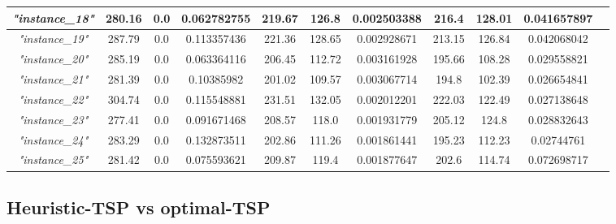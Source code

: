 \documentclass{article}
\begin{document}
\begin{table}[H]
\begin{center}
\begin{tabular}{|c||c|c|c|c|c|c|c|c|c|c|}
\hline
\textit{"instance\_18"} & 280.16 & 0.0 & 0.062782755 & 219.67 & 126.8 & 0.002503388 & 216.4 & 128.01 & 0.041657897 \\
\hline
\textit{"instance\_19"} & 287.79 & 0.0 & 0.113357436 & 221.36 & 128.65 & 0.002928671 & 213.15 & 126.84 & 0.042068042 \\
\hline
\textit{"instance\_20"} & 285.19 & 0.0 & 0.063364116 & 206.45 & 112.72 & 0.003161928 & 195.66 & 108.28 & 0.029558821 \\
\hline
\textit{"instance\_21"} & 281.39 & 0.0 & 0.10385982 & 201.02 & 109.57 & 0.003067714 & 194.8 & 102.39 & 0.026654841 \\
\hline
\textit{"instance\_22"} & 304.74 & 0.0 & 0.115548881 & 231.51 & 132.05 & 0.002012201 & 222.03 & 122.49 & 0.027138648 \\
\hline
\textit{"instance\_23"} & 277.41 & 0.0 & 0.091671468 & 208.57 & 118.0 & 0.001931779 & 205.12 & 124.8 & 0.028832643 \\
\hline
\textit{"instance\_24"} & 283.29 & 0.0 & 0.132873511 & 202.86 & 111.26 & 0.001861441 & 195.23 & 112.23 & 0.02744761 \\
\hline
\textit{"instance\_25"} & 281.42 & 0.0 & 0.075593621 & 209.87 & 119.4 & 0.001877647 & 202.6 & 114.74 & 0.072698717 \\
\hline
\end{tabular}
\end{center}
\end{table}

\newpage
\subsection{Heuristic-TSP vs optimal-TSP}
\end{document}
